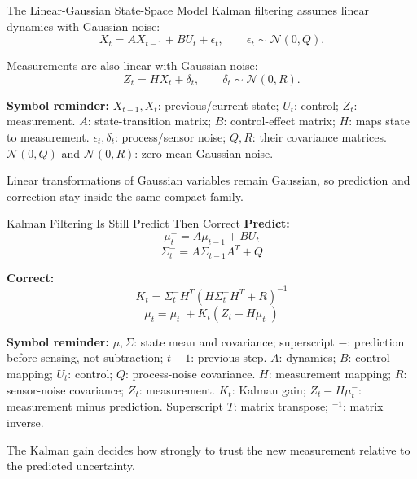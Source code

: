 \documentclass[aspectratio=169,10pt]{beamer}
\newcommand{\equationlegend}[1]{%
  \par\smallskip
  \begingroup
    \setlength{\fboxsep}{5pt}%
    \noindent\colorbox{DeckSoft}{%
      \parbox{\dimexpr\linewidth-2\fboxsep\relax}{%
        \footnotesize\textbf{Symbol reminder:} #1%
      }%
    }\par
  \endgroup
  \smallskip
}
\begin{document}
\begin{frame}[shrink=10]{The Linear-Gaussian State-Space Model}
  Kalman filtering assumes linear dynamics with Gaussian noise:
  \[
    X_t=A X_{t-1}+B U_t+\epsilon_t,
    \qquad \epsilon_t\sim\mathcal{N}(0,Q).
  \]

  Measurements are also linear with Gaussian noise:
  \[
    Z_t=H X_t+\delta_t,
    \qquad \delta_t\sim\mathcal{N}(0,R).
  \]

  \equationlegend{$X_{t-1},X_t$: previous/current state; $U_t$: control; $Z_t$: measurement. $A$: state-transition matrix; $B$: control-effect matrix; $H$: maps state to measurement. $\epsilon_t,\delta_t$: process/sensor noise; $Q,R$: their covariance matrices. $\mathcal{N}(0,Q)$ and $\mathcal{N}(0,R)$: zero-mean Gaussian noise.}

  \begin{keyidea}
    Linear transformations of Gaussian variables remain Gaussian, so prediction and correction stay inside the same compact family.
  \end{keyidea}
\end{frame}

\begin{frame}[shrink=10]{Kalman Filtering Is Still Predict Then Correct}
  \textbf{Predict:}
  \[
    \mu_t^- = A\mu_{t-1}+BU_t
  \]
  \[
    \Sigma_t^- = A\Sigma_{t-1}A^T+Q
  \]

  \textbf{Correct:}
  \[
    K_t=\Sigma_t^-H^T(H\Sigma_t^-H^T+R)^{-1}
  \]
  \[
    \mu_t=\mu_t^-+K_t(Z_t-H\mu_t^-)
  \]

  \equationlegend{$\mu,\Sigma$: state mean and covariance; superscript $-$: prediction before sensing, not subtraction; $t-1$: previous step. $A$: dynamics; $B$: control mapping; $U_t$: control; $Q$: process-noise covariance. $H$: measurement mapping; $R$: sensor-noise covariance; $Z_t$: measurement. $K_t$: Kalman gain; $Z_t-H\mu_t^-$: measurement minus prediction. Superscript $T$: matrix transpose; $^{-1}$: matrix inverse.}

  \begin{keyidea}
    The Kalman gain decides how strongly to trust the new measurement relative to the predicted uncertainty.
  \end{keyidea}
\end{frame}
\end{document}
